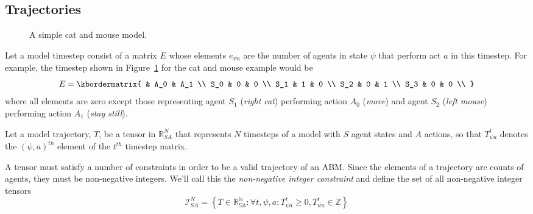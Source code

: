 \documentclass{article}
\begin{document}
\subsection{Trajectories}

\begin{figure}
	\centering
	\caption{A simple cat and mouse model.\label{fig:AB-MCMC-1}}
\end{figure}


Let a model timestep consist of a matrix $E$ whose elements $e_{\psi a}$ are the number of agents in state $\psi$ that perform act $a$ in this timestep. For example, the timestep shown in Figure~\ref{fig:AB-MCMC-1} for the cat and mouse example would be
\[
E = \kbordermatrix{
	& A_0 & A_1 \\
	S_0 & 0 & 0 \\
	S_1 & 1 & 0 \\
	S_2 & 0  & 1 \\
	S_3 & 0 & 0 \\
}
\]
where all elements are zero except those representing agent $S_1$ (\textit{right cat}) performing action $A_0$ (\textit{move}) and agent $S_2$ (\textit{left mouse}) performing action $A_1$ (\textit{stay still}).

Let a model trajectory, $T$, be a tensor in $\mathbb{R}^N_{SA}$ that represents $N$ timesteps of a model with $S$ agent states and $A$ actions, so that $T^t_{\psi a}$ denotes the $(\psi, a)^{th}$ element of the $t^{th}$ timestep matrix.

A tensor must satisfy a number of constraints in order to be a valid trajectory of an ABM. Since the elements of a trajectory are counts of agents, they must be non-negative integers. We'll call this the \textit{non-negative integer constraint} and define the set of all non-negative integer tensors
\begin{equation}
\mathcal{I}^N_{SA} = \left\{ T \in \mathbb{R^N_{SA}}: \forall t,\psi, a: T^t_{\psi a} \ge 0, T^t_{\psi a} \in \mathbb{Z}\right\}
\label{nonNegativeInt}
\end{equation}
\end{document}
